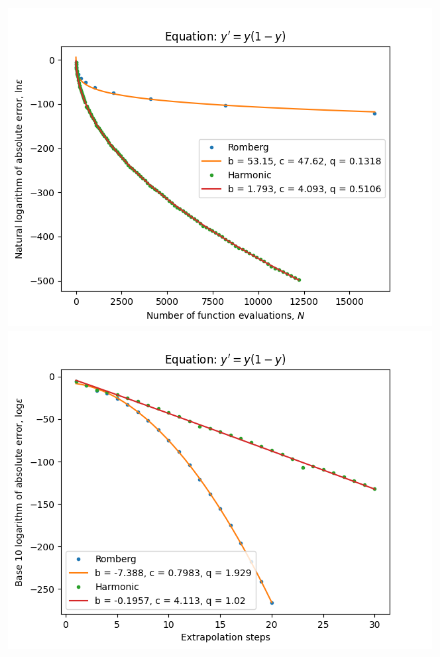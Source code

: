 \begin{figure}[H]
\centering
\begin{minipage}{0.45\textwidth}
\centering
\includegraphics[scale=0.45]{emr_plots/logistic_hp_trend.png}
\end{minipage}
\begin{minipage}{0.45\textwidth}
\centering
\includegraphics[scale=0.45]{emr_plots/logistic_hp_steps.png}
\end{minipage}
\end{figure}

